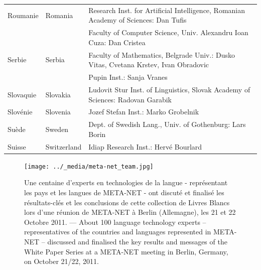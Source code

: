 \begin{longtable}{llp{105mm}}
  Roumanie & \textcolor{grey1}{Romania} & Research Inst. for Artificial Intelligence, Romanian Academy of Sciences: Dan Tufis \\ \addlinespace
  & & Faculty of Computer Science, Univ. Alexandru Ioan Cuza: Dan Cristea \\ \addlinespace

  Serbie & \textcolor{grey1}{Serbia} & Faculty of Mathematics, Belgrade Univ.: Dusko Vitas, Cvetana Krstev, Ivan Obradovic \\ \addlinespace
  & & Pupin Inst.: Sanja Vranes \\ \addlinespace  

  Slovaquie & \textcolor{grey1}{Slovakia} & Ludovit Stur Inst. of Linguistics, Slovak Academy of Sciences: Radovan Garabik \\ \addlinespace 

  Slovénie & \textcolor{grey1}{Slovenia} & Jozef Stefan Inst.: Marko Grobelnik \\ \addlinespace 

  Suède & \textcolor{grey1}{Sweden} & Dept. of Swedish Lang., Univ. of Gothenburg: Lars Borin \\ \addlinespace 

  Suisse & \textcolor{grey1}{Switzerland} & Idiap Research Inst.: Hervé Bourlard 
\end{longtable}
\normalsize

\renewcommand*{\figureformat}{}
\renewcommand*{\captionformat}{}

\begin{figure}[htbp]
  \center
\texttt{[image: ../\_media/meta-net\_team.jpg]}
  \caption{ Une centaine d'experts en technologies de la langue -
    représentant les pays et les langues de META-NET - ont discuté et
    finalisé les résultats-clés et les conclusions de cette
    collection de Livres Blancs lors d'une réunion de META-NET à
    Berlin (Allemagne), les 21 et 22 Octobre 2011. --- \textcolor{grey1}{About
      100 language technology experts -- representatives of the
      countries and languages represented in META-NET -- discussed and
      finalised the key results and messages of the White Paper Series
      at a META-NET meeting in Berlin, Germany, on October 21/22,
      2011.}}
 \medskip
\end{figure}

\cleardoublepage

